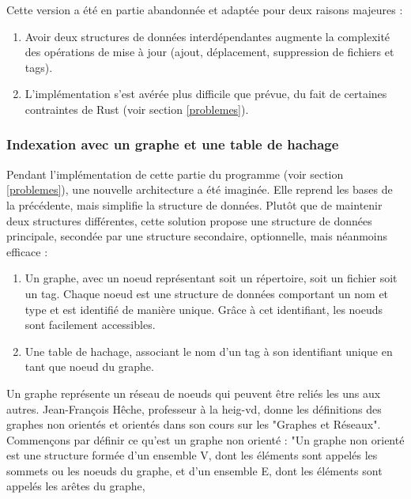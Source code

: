 Cette version a été en partie abandonnée et adaptée pour deux raisons majeures :
\begin{enumerate}
    \item Avoir deux structures de données interdépendantes augmente la complexité des 
        opérations de mise à jour (ajout, déplacement, suppression de fichiers et tags).
    \item L'implémentation s'est avérée plus difficile que prévue, du fait de certaines 
        contraintes de Rust (voir section \ref{problemes}).
\end{enumerate}

\subsubsection{Indexation avec un graphe et une table de hachage}\label{graphe_architecture}
Pendant l'implémentation de cette partie du programme (voir section \ref{problemes}), 
une nouvelle architecture a été imaginée. Elle reprend les bases de la précédente, mais simplifie 
la structure de données. Plutôt que de maintenir deux structures différentes, cette solution 
propose une structure de données principale, secondée par une structure secondaire, optionnelle, 
mais néanmoins efficace :
\begin{enumerate}
    \item Un graphe, avec un noeud représentant soit un répertoire, soit un fichier 
        soit un tag. Chaque noeud est une structure de données comportant un nom et type et est 
        identifié de manière unique. Grâce à cet identifiant, les noeuds sont facilement accessibles.
    \item Une table de hachage, associant le nom d'un tag à son identifiant unique en tant que 
        noeud du graphe.
\end{enumerate}
Un graphe représente un réseau de noeuds qui peuvent être reliés les uns aux autres. Jean-François Hêche, 
professeur à la heig-vd, donne les définitions des graphes non orientés et orientés dans son cours 
sur les "Graphes et Réseaux". Commençons par définir ce qu'est un graphe non orienté : 
"Un graphe non orienté est une structure formée d'un ensemble V, dont les éléments sont appelés les sommets 
ou les noeuds du graphe, et d'un ensemble E, dont les éléments sont appelés les arêtes du graphe, 
